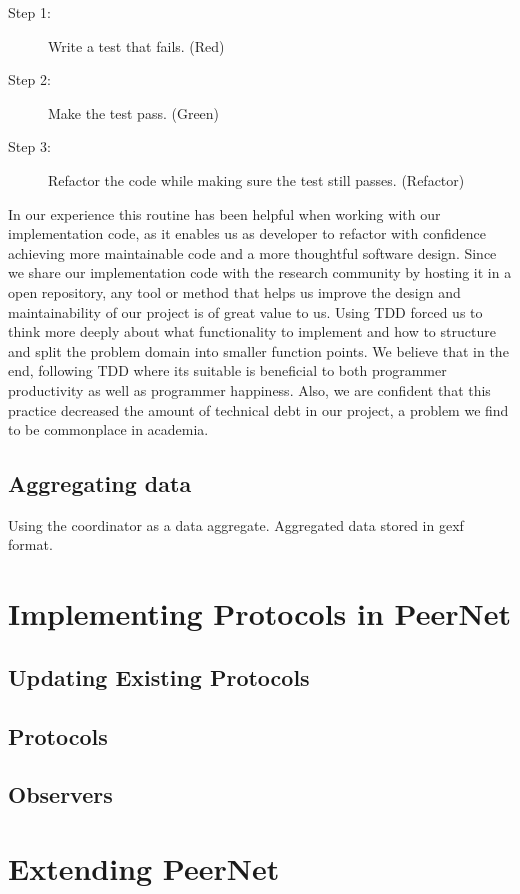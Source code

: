 \begin{description}
    \item[Step 1:] Write a test that fails. (Red)
    \item[Step 2:] Make the test pass. (Green)
    \item[Step 3:] Refactor the code while making sure the test
        still passes. (Refactor)
\end{description}

In our experience this routine has been helpful when working
with our implementation code, as it enables us as developer to
refactor with confidence achieving more maintainable code and a
more thoughtful software design. Since we share our
implementation code with the research community by hosting it in
a open repository, any tool or method that helps us improve the
design and maintainability of our project is of great value to
us. Using TDD forced us to think more deeply about what
functionality to implement and how to structure and split the
problem domain into smaller function points. We believe that in
the end, following TDD where its suitable is beneficial to both
programmer productivity as well as programmer happiness. Also,
we are confident that this practice decreased the amount of
technical debt in our project, a problem we find to be commonplace in academia.

\subsection{Aggregating data}
Using the coordinator as a data aggregate. Aggregated data
stored in gexf format.

\section{Implementing Protocols in PeerNet}
\subsection{Updating Existing Protocols}
\subsection{Protocols}
\subsection{Observers}

\section{Extending PeerNet}

